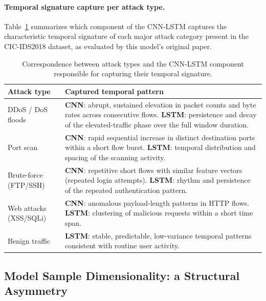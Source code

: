 \documentclass[../main.tex]{subfiles}
\begin{document}
\paragraph{Temporal signature capture per attack type.}
Table~\ref{tab:cnn-lstm-attack-patterns} summarizes which component of the CNN-LSTM captures the characteristic temporal signature of each major attack category present in the CIC-IDS2018 dataset, as evaluated by this model's original paper\supercite{jablaoui2024effective}.

\begin{table}[H]
\centering
\caption{Correspondence between attack types and the CNN-LSTM component responsible for capturing their temporal signature.}
\label{tab:cnn-lstm-attack-patterns}
\small
\begin{tabular}{lp{8cm}}
\toprule
\textbf{Attack type}   & \textbf{Captured temporal pattern} \\
\midrule
DDoS / DoS floods      & \textbf{CNN}: abrupt, sustained elevation in packet counts and byte rates across consecutive flows. \textbf{LSTM}: persistence and decay of the elevated-traffic phase over the full window duration. \\
Port scan              & \textbf{CNN}: rapid sequential increase in distinct destination ports within a short flow burst. \textbf{LSTM}: temporal distribution and spacing of the scanning activity. \\
Brute-force (FTP/SSH)  & \textbf{CNN}: repetitive short flows with similar feature vectors (repeated login attempts). \textbf{LSTM}: rhythm and persistence of the repeated authentication pattern. \\
Web attacks (XSS/SQLi) & \textbf{CNN}: anomalous payload-length patterns in HTTP flows. \textbf{LSTM}: clustering of malicious requests within a short time span. \\
Benign traffic         & \textbf{LSTM}: stable, predictable, low-variance temporal patterns consistent with routine user activity. \\
\bottomrule
\end{tabular}
\end{table}

\newpage
\subsection{Model Sample Dimensionality: a Structural Asymmetry}
\label{sec:sample-dimensionality}
\end{document}
